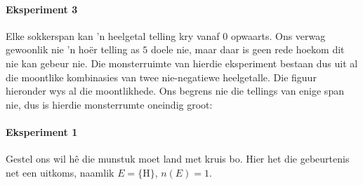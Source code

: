 \paragraph{Eksperiment 3} Elke sokkerspan kan 'n heelgetal telling kry vanaf $0$ opwaarts. Ons verwag gewoonlik nie 'n ho\"er telling as $5$ doele nie, maar daar is geen rede hoekom dit nie kan gebeur nie. Die monsterruimte van hierdie eksperiment bestaan dus uit al die moontlike kombinasies van twee nie-negatiewe heelgetalle. Die figuur hieronder wys al die moontlikhede. Ons begrens nie die tellings van enige span nie, dus is hierdie monsterrumte oneindig groot:

\begin{figure}[h]
\begin{center}
\end{center}
\end{figure}


\paragraph{Eksperiment 1} Gestel ons wil h\^e die munstuk moet land met kruis bo. Hier het die gebeurtenis net een uitkoms, naamlik
\(E=\{\mbox{H}\}\), \(n(E)=1\).

